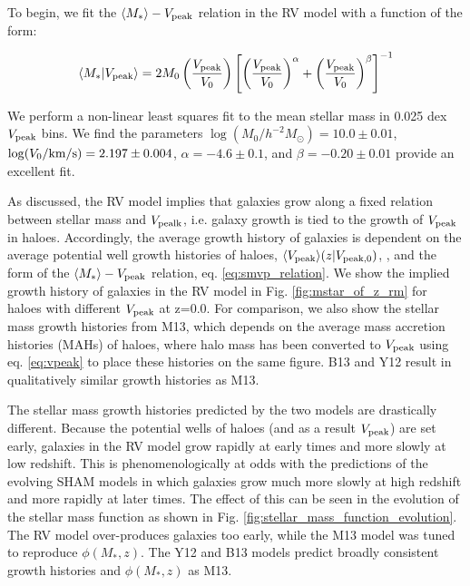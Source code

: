 \documentclass[a4paper,fleqn,usenatbib]{mnras}
\begin{document}
To begin, we fit the $\langle M_* \rangle - V_{\rm peak}$ relation in the RV model with a function of the form:
%
\begin{linenomath}
\begin{equation}
\label{eq:smvp_relation}
\langle M_* | V_{\rm peak} \rangle = 2M_0\left(\frac{V_{\rm peak}}{V_0}\right)\left[\left(\frac{V_{\rm peak}}{V_0}\right)^{\alpha}+\left(\frac{V_{\rm peak}}{V_0}\right)^{\beta}\right]^{-1}
\end{equation}
\end{linenomath}
%
We perform a non-linear least squares fit to the mean stellar mass in 0.025 dex $V_{\rm peak}$ bins.  We find the parameters $\log(M_0/h^{-2}M_{\odot})=10.0 \pm 0.01$, $\log(V_0/{\rm km/s})=2.197 \pm 0.004$, $\alpha=-4.6 \pm 0.1$, and $\beta=-0.20 \pm 0.01$ provide an excellent fit.

As discussed, the RV model implies that galaxies grow along a fixed relation between stellar mass and $V_{\rm pealk}$, i.e. galaxy growth is tied to the growth of $V_{\rm peak}$ in haloes.  Accordingly, the average growth history of galaxies is dependent on the average potential well growth histories of haloes, $\langle V_{\rm peak} \rangle (z | V_{\rm peak, 0})$, \citep[PWGHs,][]{Bosch:2014cu}, and the form of the $\langle M_*\rangle - V_{\rm peak}$ relation, eq. \ref{eq:smvp_relation}.  We show the implied growth history of galaxies in the RV model in Fig. \ref{fig:mstar_of_z_rm} for haloes with different $V_{\rm peak}$ at z=0.0.  For comparison, we also show the stellar mass growth histories from M13, which depends on the average mass accretion histories (MAHs) of haloes, where halo mass has been converted to $V_{\rm peak}$ using eq. \ref{eq:vpeak} to place these histories on the same figure.  B13 and Y12 result in qualitatively similar growth histories as M13.    

The stellar mass growth histories predicted by the two models are drastically different.  Because the potential wells of haloes (and as a result $V_{\rm peak}$) are set early, galaxies in the RV model grow rapidly at early times and more slowly at low redshift.  This is phenomenologically at odds with the predictions of the evolving SHAM models in which galaxies grow much more slowly at high redshift and more rapidly at later times.  The effect of this can be seen in the evolution of the stellar mass function as shown in Fig. \ref{fig:stellar_mass_function_evolution}.  The RV model over-produces galaxies too early, while the M13 model was tuned to reproduce $\phi(M_*,z)$.  The Y12 and B13 models predict broadly consistent growth histories and $\phi(M_*,z)$ as M13.
\end{document}

